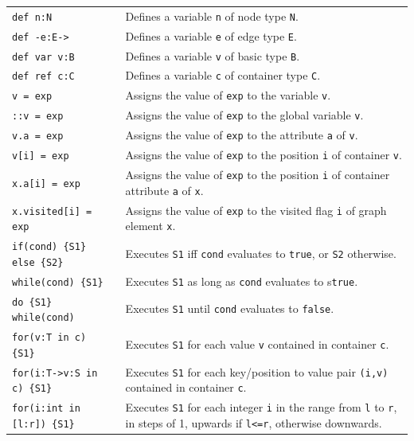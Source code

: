 \begin{table}[htbp]
\begin{minipage}{\linewidth} \renewcommand{\footnoterule}{} 
\begin{tabularx}{\linewidth}{|lX|}
\hline
\texttt{def n:N}	& Defines a variable \texttt{n} of node type \texttt{N}.\\
\texttt{def -e:E->}	& Defines a variable \texttt{e} of edge type \texttt{E}.\\
\texttt{def var v:B}	& Defines a variable \texttt{v} of basic type \texttt{B}.\\
\texttt{def ref c:C}	& Defines a variable \texttt{c} of container type \texttt{C}.\\
\hline
\texttt{v = exp} & Assigns the value of \texttt{exp} to the variable \texttt{v}.\\
\texttt{::v = exp} & Assigns the value of \texttt{exp} to the global variable \texttt{v}.\\
\texttt{v.a = exp} & Assigns the value of \texttt{exp} to the attribute \texttt{a} of \texttt{v}.\\
\texttt{v[i] = exp} & Assigns the value of \texttt{exp} to the position \texttt{i} of container \texttt{v}.\\
\texttt{x.a[i] = exp} & Assigns the value of \texttt{exp} to the position \texttt{i} of container attribute \texttt{a} of \texttt{x}.\\
\texttt{x.visited[i] = exp} & Assigns the value of \texttt{exp} to the visited flag \texttt{i} of graph element \texttt{x}.\\
\hline
\texttt{if(cond) \{S1\} else \{S2\}} & Executes \texttt{S1} iff \texttt{cond} evaluates to \texttt{true}, or \texttt{S2} otherwise.\\
\texttt{while(cond) \{S1\} } & Executes \texttt{S1} as long as \texttt{cond} evaluates to s\texttt{true}.\\
\texttt{do \{S1\} while(cond) } & Executes \texttt{S1} until \texttt{cond} evaluates to \texttt{false}.\\
\texttt{for(v:T in c) \{S1\} } & Executes \texttt{S1} for each value \texttt{v} contained in container \texttt{c}.\\
\texttt{for(i:T->v:S in c) \{S1\} } & Executes \texttt{S1} for each key/position to value pair \texttt{(i,v)} contained in container \texttt{c}.\\
\texttt{for(i:int in [l:r]) \{S1\} } & Executes \texttt{S1} for each integer \texttt{i} in the range from \texttt{l} to \texttt{r}, in steps of 1, upwards if \texttt{l<=r}, otherwise downwards.\\

\end{tabularx}
\end{minipage}
\end{table}
